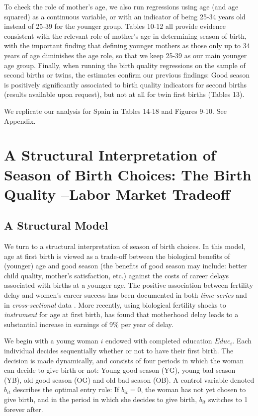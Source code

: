 \documentclass[a4paper, 12 pt]{article}
\theoremstyle{plain}
\begin{document}
\begin{doublespace}
To check the role of mother's age, we also run regressions using age (and age squared) as a continuous variable, or with an indicator of being 25-34 years old instead of 25-39 for the younger group. Tables 10-12 all provide evidence consistent with the relevant role of mother's age in determining season of birth, with the important finding that defining younger mothers as those only up to 34 years of age diminishes the age role, so that we keep 25-39 as our main younger age group. Finally, when running the birth quality regressions on the sample of second births or twins, the estimates confirm our previous findings: Good season is positively significantly associated to birth quality indicators for second births (results available upon request), but not at all for twin first births (Tables 13).

We replicate our analysis for Spain in Tables 14-18 and Figures 9-10. See Appendix.

\newpage
\section{A Structural Interpretation of Season of Birth Choices: The Birth Quality%
--Labor Market Tradeoff}
\subsection{A Structural Model}
We turn to a structural interpretation of season of birth choices. In
this model, age at first birth is viewed as a trade-off between the biological
benefits of (younger) age and good season (the benefits of good season may include: better child quality, mother's satisfaction, etc.) against the costs of career delays
associated with births at a younger age. The positive association between fertility delay and women's career success has been documented in both \emph{time-series} \citep{Caucutt2002} and in \emph{cross-sectional} data \citep{Hofferth1984}. More recently, using biological fertility shocks to \emph{instrument} for age at first birth, \citet{Miller2011} has found that motherhood delay leads to a substantial increase in earnings of 9\% per year of delay.%


We begin with a young woman $i$ endowed with completed education $Educ_i$.  Each
individual decides sequentially whether or not to have their first birth.  The
decision is made dynamically, and consists of four periods in which the woman
can decide to give birth or not: Young good season (YG), young bad season (YB),
old good season (OG) and old bad season (OB). A control variable denoted $b_{it}$
describes the optimal entry rule: If $b_{it}=0$, the woman has not yet chosen to
give birth, and in the period in which she decides to give birth, $b_{it}$
switches to 1 forever after.


\end{doublespace}
\end{document}
